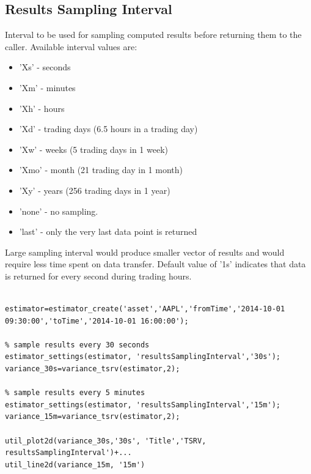 \documentclass[letterpaper]{report}
\begin{document}
\subsection{Results Sampling Interval}
Interval to be used for sampling computed results before returning them to the caller. 
Available interval values are: 
\begin{itemize} 
  \item 'Xs' - seconds
  \item 'Xm' - minutes
  \item 'Xh' - hours
  \item 'Xd' - trading days (6.5 hours in a trading day)
  \item 'Xw' - weeks (5 trading days in 1 week)
  \item 'Xmo' - month (21 trading day in 1 month)
  \item 'Xy' - years (256 trading days in 1 year)
  \item 'none' - no sampling.
  \item 'last' - only the very last data point is returned  
\end{itemize}
Large sampling interval would produce smaller vector of results and would require less time spent on data transfer. 
Default value of '1s' indicates that data is returned for every second during
trading hours.
\begin{lstlisting}

estimator=estimator_create('asset','AAPL','fromTime','2014-10-01 09:30:00','toTime','2014-10-01 16:00:00');

% sample results every 30 seconds
estimator_settings(estimator, 'resultsSamplingInterval','30s');
variance_30s=variance_tsrv(estimator,2);

% sample results every 5 minutes
estimator_settings(estimator, 'resultsSamplingInterval','15m');
variance_15m=variance_tsrv(estimator,2);

util_plot2d(variance_30s,'30s', 'Title','TSRV, resultsSamplingInterval')+...
util_line2d(variance_15m, '15m')
\end{lstlisting}
\end{document}

